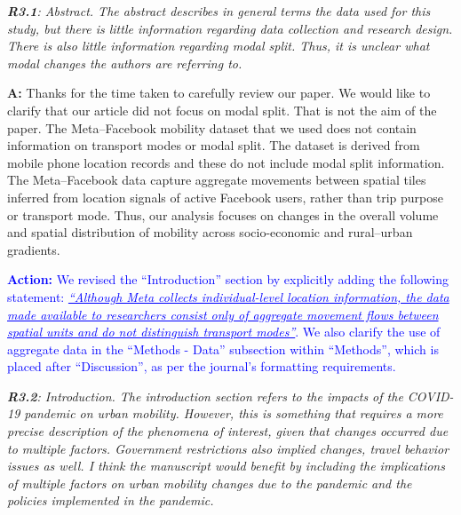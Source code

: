 \documentclass[12pt,a4paper,oneside, reqno]{amsart}
\begin{document}
\textit{\textbf{R3.1}: Abstract. The abstract describes in general terms the data used for this study, but there is little information regarding data collection and research design. There is also little information regarding modal split. Thus, it is unclear what modal changes the authors are referring to.}

\setlength{\leftskip}{1cm}\textbf{A:} Thanks for the time taken to carefully review our paper. We would like to clarify that our article did not focus on modal split. That is not the aim of the paper. The Meta–Facebook mobility dataset that we used does not contain information on transport modes or modal split. The dataset is derived from mobile phone location records and these do not include modal split information. The Meta–Facebook data capture aggregate movements between spatial tiles inferred from location signals of active Facebook users, rather than trip purpose or transport mode. Thus, our analysis focuses on changes in the overall volume and spatial distribution of mobility across socio-economic and rural–urban gradients.

\textcolor{blue}{
\textbf{Action:} We revised the ``Introduction'' section by explicitly adding the following statement: \textit{\uline{``Although Meta collects individual-level location information, the data made available to researchers consist only of aggregate movement flows between spatial units and do not distinguish transport modes''}}. We also clarify the use of aggregate data in the ``Methods - Data'' subsection within ``Methods'', which is placed after ``Discussion'', as per the journal's formatting requirements. 
}

\setlength{\leftskip}{0cm} \textit{\textbf{R3.2}: Introduction. The introduction section refers to the impacts of the COVID-19 pandemic on urban mobility. However, this is something that requires a more precise description of the phenomena of interest, given that changes occurred due to multiple factors. Government restrictions also implied changes, travel behavior issues as well. I think the manuscript would benefit by including the implications of multiple factors on urban mobility changes due to the pandemic and the policies implemented in the pandemic.}
\end{document}
